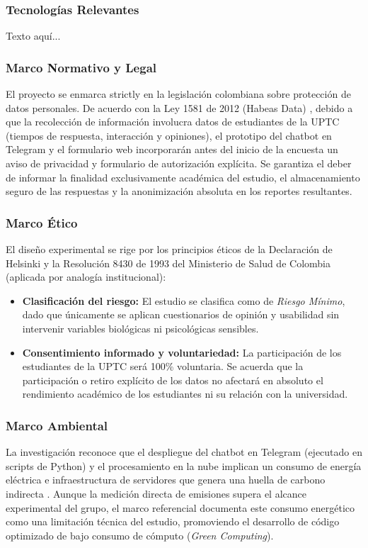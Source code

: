\documentclass[12pt,letterpaper]{article}
\begin{document}
\subsubsection{Tecnologías Relevantes}
Texto aquí...

\subsubsection{Marco Normativo y Legal}
El proyecto se enmarca strictly en la legislación colombiana sobre protección de datos personales. De acuerdo con la Ley 1581 de 2012 (Habeas Data) \cite{ley1581}, debido a que la recolección de información involucra datos de estudiantes de la UPTC (tiempos de respuesta, interacción y opiniones), el prototipo del chatbot en Telegram y el formulario web incorporarán antes del inicio de la encuesta un aviso de privacidad y formulario de autorización explícita. Se garantiza el deber de informar la finalidad exclusivamente académica del estudio, el almacenamiento seguro de las respuestas y la anonimización absoluta en los reportes resultantes.
 
\subsubsection{Marco Ético}
El diseño experimental se rige por los principios éticos de la Declaración de Helsinki \cite{helsinki2013} y la Resolución 8430 de 1993 del Ministerio de Salud de Colombia \cite{res8430} (aplicada por analogía institucional):
\begin{itemize}
    \item \textbf{Clasificación del riesgo:} El estudio se clasifica como de \textit{Riesgo Mínimo}, dado que únicamente se aplican cuestionarios de opinión y usabilidad sin intervenir variables biológicas ni psicológicas sensibles.
    \item \textbf{Consentimiento informado y voluntariedad:} La participación de los estudiantes de la UPTC será 100\% voluntaria. Se acuerda que la participación o retiro explícito de los datos no afectará en absoluto el rendimiento académico de los estudiantes ni su relación con la universidad.
\end{itemize}
 
\subsubsection{Marco Ambiental}
La investigación reconoce que el despliegue del chatbot en Telegram (ejecutado en scripts de Python) y el procesamiento en la nube implican un consumo de energía eléctrica e infraestructura de servidores que genera una huella de carbono indirecta \cite{strubell2019}. Aunque la medición directa de emisiones supera el alcance experimental del grupo, el marco referencial documenta este consumo energético como una limitación técnica del estudio, promoviendo el desarrollo de código optimizado de bajo consumo de cómputo (\textit{Green Computing}).
 
\end{document}
